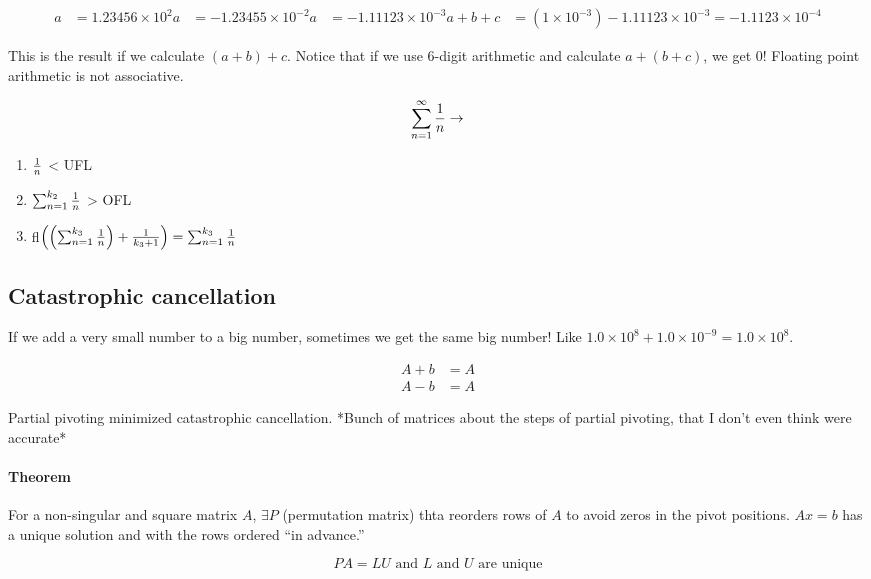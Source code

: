 \begin{align*}
  a &= 1.23456 \times 10^2
  a &= -1.23455 \times 10^{-2}
  a &= -1.11123 \times 10^{-3}
  a+b+c &= (1 \times 10^{-3}) -1.11123 \times 10^{-3} = -1.1123 \times 10^{-4}
\end{align*}

This is the result if we calculate $(a+b) + c$. Notice that if we use 6-digit arithmetic and calculate $a+(b+c)$, we get 0! Floating point arithmetic is not associative.

\[
  \sum_{n=1}^\infty {1 \over n} \to
\]

\begin{enumerate}
  \item ${1 \over n}$ < UFL
  \item $\sum_{n=1}^{k_2} {1 \over n}$ > OFL
  \item fl$\left(\left(\sum_{n=1}^{k_3} {1 \over n}\right) + {1 \over k_3 + 1} \right) = \sum_{n=1}^{k_3} {1 \over n}$
\end{enumerate}

\subsection{Catastrophic cancellation}

If we add a very small number to a big number, sometimes we get the same big number! Like $1.0 \times 10^8 + 1.0 \times 10^{-9} = 1.0 \times 10^8$.

\begin{align*}
  A + b &= A \\
  A - b &= A
\end{align*}

Partial pivoting minimized catastrophic cancellation. *Bunch of matrices about the steps of partial pivoting, that I don't even think were accurate*

\paragraph{Theorem} For a non-singular and square matrix $A$, $\exists P$ (permutation matrix) thta reorders rows of $A$ to avoid zeros in the pivot positions. $Ax=b$ has a unique solution and with the rows ordered ``in advance.''

\[
  PA = LU \text{ and } L \text{ and } U \text{ are unique}
\]